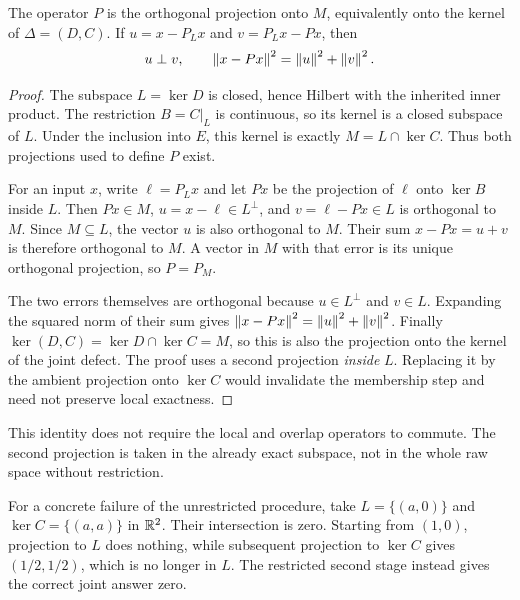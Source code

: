 \begin{theorem}\label{KS46}
The operator \(P\) is the orthogonal projection onto \(M\), equivalently onto the kernel of \(\Delta=(D,C)\). If \(u=x-P_Lx\) and \(v=P_Lx-Px\), then
\[
 u\perp v,\qquad\left\lVert x-Px\right\rVert^2=\left\lVert u\right\rVert^2+\left\lVert v\right\rVert^2.
\]
\end{theorem}
\begin{proof}
The subspace \(L=\ker D\) is closed, hence Hilbert with the inherited inner product. The restriction \(B=C|_L\) is continuous, so its kernel is a closed subspace of \(L\). Under the inclusion into \(E\), this kernel is exactly \(M=L\cap\ker C\). Thus both projections used to define \(P\) exist.

For an input \(x\), write \(\ell=P_Lx\) and let \(Px\) be the projection of \(\ell\) onto \(\ker B\) inside \(L\). Then \(Px\in M\), \(u=x-\ell\in L^\perp\), and \(v=\ell-Px\in L\) is orthogonal to \(M\). Since \(M\subseteq L\), the vector \(u\) is also orthogonal to \(M\). Their sum \(x-Px=u+v\) is therefore orthogonal to \(M\). A vector in \(M\) with that error is its unique orthogonal projection, so \(P=P_M\).

The two errors themselves are orthogonal because \(u\in L^\perp\) and \(v\in L\). Expanding the squared norm of their sum gives \(\left\lVert x-Px\right\rVert^2=\left\lVert u\right\rVert^2+\left\lVert v\right\rVert^2\). Finally \(\ker(D,C)=\ker D\cap\ker C=M\), so this is also the projection onto the kernel of the joint defect. The proof uses a second projection \emph{inside} \(L\). Replacing it by the ambient projection onto \(\ker C\) would invalidate the membership step and need not preserve local exactness.
\end{proof}
This identity does not require the local and overlap operators to commute. The second projection is taken in the already exact subspace, not in the whole raw space without restriction.

For a concrete failure of the unrestricted procedure, take \(L=\{(a,0)\}\) and \(\ker C=\{(a,a)\}\) in \(\mathbb R^2\). Their intersection is zero. Starting from \((1,0)\), projection to \(L\) does nothing, while subsequent projection to \(\ker C\) gives \((1/2,1/2)\), which is no longer in \(L\). The restricted second stage instead gives the correct joint answer zero.


